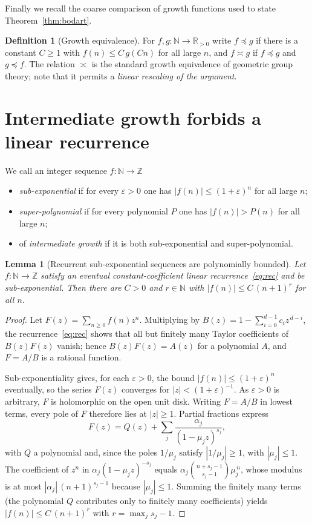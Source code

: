 \documentclass[reqno]{amsart}
\theoremstyle{plain}
\newtheorem{lemma}[theorem]{Lemma}
\theoremstyle{definition}
\newtheorem{definition}[theorem]{Definition}
\theoremstyle{remark}
\newcommand{\Z}{\mathbb{Z}}
\newcommand{\R}{\mathbb{R}}
\newcommand{\N}{\mathbb{N}}
\begin{document}
Finally we recall the coarse comparison of growth functions used to state
Theorem~\ref{thm:bodart}.

\begin{definition}[Growth equivalence]
For $f,g\colon\N\to\R_{>0}$ write $f\preceq g$ if there is a constant $C\ge1$ with
$f(n)\le C\,g(Cn)$ for all large $n$, and $f\asymp g$ if $f\preceq g$ and $g\preceq f$. The
relation $\asymp$ is the standard growth equivalence of geometric group theory; note that it
permits a \emph{linear rescaling of the argument}.
\end{definition}

\section{Intermediate growth forbids a linear recurrence}
\label{sec:bridge}

We call an integer sequence $f\colon\N\to\Z$
\begin{itemize}
  \item \emph{sub-exponential} if for every $\varepsilon>0$ one has $|f(n)|\le(1+\varepsilon)^n$
    for all large $n$;
  \item \emph{super-polynomial} if for every polynomial $P$ one has $|f(n)|>P(n)$ for all large
    $n$;
  \item of \emph{intermediate growth} if it is both sub-exponential and super-polynomial.
\end{itemize}

\begin{lemma}[Recurrent sub-exponential sequences are polynomially bounded]
\label{lem:poly}
Let $f\colon\N\to\Z$ satisfy an eventual constant-coefficient linear recurrence~\eqref{eq:rec} and
be sub-exponential. Then there are $C>0$ and $r\in\N$ with $|f(n)|\le C\,(n+1)^{r}$ for all $n$.
\end{lemma}

\begin{proof}
Let $F(z)=\sum_{n\ge0}f(n)z^{n}$. Multiplying by $B(z)=1-\sum_{i=0}^{d-1}c_i z^{\,d-i}$, the
recurrence~\eqref{eq:rec} shows that all but finitely many Taylor coefficients of $B(z)F(z)$
vanish; hence $B(z)F(z)=A(z)$ for a polynomial $A$, and $F=A/B$ is a rational function.

Sub-exponentiality gives, for each $\varepsilon>0$, the bound $|f(n)|\le(1+\varepsilon)^n$
eventually, so the series $F(z)$ converges for $|z|<(1+\varepsilon)^{-1}$. As $\varepsilon>0$ is
arbitrary, $F$ is holomorphic on the open unit disk. Writing $F=A/B$ in lowest terms, every pole
of $F$ therefore lies at $|z|\ge1$. Partial fractions express
\[
  F(z)=Q(z)+\sum_{j}\frac{\alpha_j}{(1-\mu_j z)^{s_j}},
\]
with $Q$ a polynomial and, since the poles $1/\mu_j$ satisfy $|1/\mu_j|\ge1$, with $|\mu_j|\le1$.
The coefficient of $z^{n}$ in $\alpha_j(1-\mu_j z)^{-s_j}$ equals
$\alpha_j\binom{n+s_j-1}{s_j-1}\mu_j^{\,n}$, whose modulus is at most
$|\alpha_j|\,(n+1)^{s_j-1}$ because $|\mu_j|\le1$. Summing the finitely many terms (the polynomial
$Q$ contributes only to finitely many coefficients) yields $|f(n)|\le C\,(n+1)^{r}$ with
$r=\max_j s_j-1$.
\end{proof}
\end{document}
